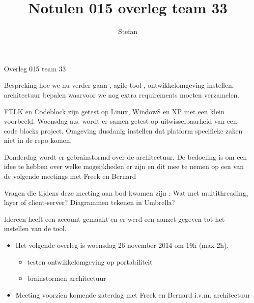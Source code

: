 \documentclass{article}
\title{Notulen 015 overleg team 33}
\author{Stefan}
\begin{document}

\begin{Minutes}{Overleg 015 team 33}

\maketitle%


Bespreking hoe we nu verder gaan , agile tool , ontwikkelomgeving instellen,
architectuur bepalen waarvoor we nog extra requirements moeten verzamelen.


FTLK en Codeblock zijn getest op Linux, Window8 en XP met een klein voorbeeld.
Woensdag a.s. wordt er samen getest op uitwisselbaarheid van een code blocks project.
Omgeving dusdanig instellen dat platform specifieke zaken niet in de repo komen. 



Donderdag wordt er gebrainstormd over de architectuur.
De bedoeling is om een idee te hebben over welke mogeijkheden er zijn
en dit mee te nemen op een van de volgende meetings met Freek en Bernard

Vragen die tijdens deze meeting aan bod kwamen zijn : Wat met multithreading,
layer of client-server?
Diagrammen tekenen in Umbrella?


Idereen heeft een account gemaakt en er werd een aanzet gegeven tot het instellen van de tool.


\begin{itemize}

 \item Het volgende overleg is woensdag 26 november 2014 om 19h  (max 2h). 
 

\begin{itemize}
\item testen ontwikkelomgeving op portabiliteit
\item brainstormen architectuur
\end{itemize}

 \item  Meeting voorzien komende zaterdag met Freek en Bernard i.v.m. architectuur
\end{itemize}


\end{Minutes}
\end{document}
